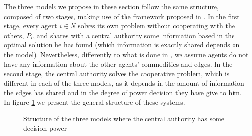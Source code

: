 \documentclass{article}
\begin{document}
The three models we propose in these section follow the same structure, composed of two stages, making use of the framework proposed in \cite{ANUPINDI2001}. In the first stage, every agent $i\in N$ solves its own problem without cooperating with the others, $P_i$, and shares with a central authority some information based in the optimal solution he has found (which information is exactly shared depends on the model). Nevertheless, differently to what is done in \cite{ANUPINDI2001}, we assume agents do not have any information about the other agents' commodities and edges. In the second stage, the central authority solves the cooperative problem, which is different in each of the three models, as it depends in the amount of information the edges has shared and in the degree of power decision they have give to him. In figure \ref{fig:generalflowchart} we present the general structure of these systems.


\begin{figure}[ht!]
\centering
\caption{Structure of the three models where the central authority has some decision power \label{fig:generalflowchart}}
\end{figure}
\end{document}

